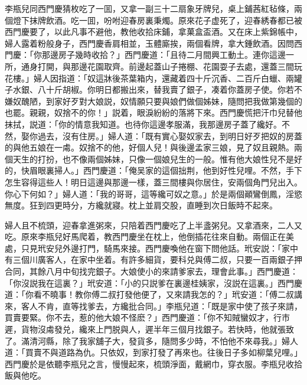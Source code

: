 李瓶兒同西門慶猜枚吃了一囬，又拿一副三十二扇象牙牌兒，桌上鋪茜紅毡條，兩個燈下抹牌飲酒。吃一囬，吩咐迎春房裏秉燭。原來花子虚死了，迎春綉春都已被西門慶要了，以此凡事不避他，教他收拾床鋪，拿菓盒盃酒。又在床上紫錦帳中，婦人露着粉般身子，西門慶香肩相並，玉體廝挨，兩個看牌，拿大鍾飲酒。因問西門慶：「你那邊房子幾時收拾？」西門慶道：「且待二月間興工動土。連你這邊一所，通身打開，與那邊花園取齊。前邊起蓋山子捲棚、花園耍子去處，還蓋三間玩花樓。」婦人因指道：「奴這牀後茶葉箱内，還藏着四十斤沉香、二百斤白蠟、兩罐子水銀、八十斤胡椒。你明日都搬出來，替我賣了銀子，凑着你蓋房子使。你若不嫌奴醜陋，到家好歹對大娘説，奴情願只要與娘們做個姊妹，隨問把我做第幾個的也罷。親親，奴捨不的你！」説着，眼淚紛紛的落將下來。西門慶慌把汗巾兒替他抹拭，説道：「你的情意我知道。也待你這邊孝服滿，我那邊房子蓋了纔好。不然，娶你過去，沒有住房。」婦人道：「既有實心娶奴家去，到明日好歹把奴的房蓋的與他五娘在一䖏。奴捨不的他，好個人兒！與後邊孟家三娘，見了奴且親熱。兩個天生的打扮，也不像兩個姊妹，只像一個娘兒生的一般。惟有他大娘性兒不是好的，快眉眼裏掃人。」西門慶道：「俺吴家的這個拙荆，他到好性兒哩。不然，手下怎生容得這些人！明日這邊與那邊一樣，蓋三間樓與你居住，安兩個角門兒出入。你心下何如？」婦人道：「我的哥哥，這等纔可奴之意。」於是兩個顚鸞倒鳳，淫慾無度。狂到四更時分，方纔就寢。枕上並肩交股，直睡到次日飯時不起來。

婦人且不梳頭，迎春拿進粥來，只陪着西門慶吃了上半盞粥兒。又拿酒來，二人又吃。原來李瓶兒好馬爬着，教西門慶坐在枕上，他倒插花往來自動。兩個正在美處，只見玳安兒外邊打門，騎馬來接。西門慶喚他在窗下問他話。玳安説：「家中有三個川廣客人，在家中坐着。有許多細貨，要科兑與傅二叔，只要一百兩銀子押合同，其餘八月中旬找完銀子。大娘使小的來請爹家去，理會此事。」西門慶道：「你沒説我在這裏？」玳安道：「小的只説爹在裏邊桂姨家，沒説在這裏。」西門慶道：「你看不曉事！教你傅二叔打發他便了，又來請我怎的？」玳安道：「傅二叔講來，客人不肯，直等找爹去，方纔批合同。」李瓶兒道：「既是家中使了孩子來請，買賣要緊。你不去，惹的他大娘不怪麽？」西門慶道：「你不知賊蠻奴才，行巿遲，貨物沒䖏發兑，纔來上門脱與人，遲半年三個月找銀子。若快時，他就張致了。滿清河縣，除了我家舖子大，發貨多，隨問多少時，不怕他不來尋我。」婦人道：「買賣不與道路為仇。只依奴，到家打發了再來也。往後日子多如柳葉兒哩。」西門慶於是依聽李瓶兒之言，慢慢起來，梳頭淨面，戴網巾，穿衣服。李瓶兒收拾飯與他吃。

